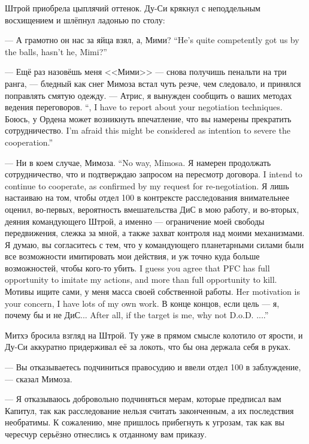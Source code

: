 Штрой приобрела цыплячий оттенок.
Ду-Си крякнул с неподдельным восхищением и шлёпнул ладонью по столу:

{--- А грамотно он нас за яйца взял, а, Мими?}
{``He's quite competently got us by the balls, hasn't he, Mimi?''}

--- Ещё раз назовёшь меня <<Мими>> --- снова получишь пенальти на три ранга, --- бледный как снег Мимоза встал чуть резче, чем следовало, и принялся поправлять смятую одежду.
{--- Атрис, я вынужден сообщить о ваших методах ведения переговоров.}
{``\Aatris, I have to report about your negotiation techniques.}
{Боюсь, у Ордена может возникнуть впечатление, что вы намерены прекратить сотрудничество.}
{I'm afraid this might be considered as intention to severe the cooperation.''}

{--- Ни в коем случае, Мимоза.}
{``No way, Mimosa.}
{Я намерен продолжать сотрудничество, что и подтверждаю запросом на пересмотр договора.}
{I intend to continue to cooperate, as confirmed by my request for re-negotiation.}
Я лишь настаиваю на том, чтобы отдел 100 в контрексте расследования внимательнее оценил, во-первых, вероятность вмешательства ДиС в мою работу, и во-вторых, деяния командующего Штрой, а именно --- ограничение моей свободы передвижения, слежка за мной, а также захват контроля над моими механизмами.
{Я думаю, вы согласитесь с тем, что у командующего планетарными силами были все возможности имитировать мои действия, и уж точно куда больше возможностей, чтобы кого-то убить.}
{I guess you agree that PFC has full opportunity to imitate my actions, and more than full opportunity to kill.} %
{Мотивы ищите сами, у меня масса своей собственной работы.}
{Her motivation is your concern, I have lots of my own work.}
{В конце концов, если цель --- я, почему бы и не ДиС...}
{After all, if the target is me, why not D.o.D. ....''}

Митхэ бросила взгляд на Штрой.
Ту уже в прямом смысле колотило от ярости, и Ду-Си аккуратно придерживал её за локоть, что бы она держала себя в руках.

--- Вы отказываетесь подчиниться правосудию и ввели отдел 100 в заблуждение, --- сказал Мимоза.

--- Я отказываюсь добровольно подчиняться мерам, которые предписал вам Капитул, так как расследование нельзя считать законченным, а их последствия необратимы.
К сожалению, мне пришлось прибегнуть к угрозам, так как вы чересчур серьёзно отнеслись к отданному вам приказу.

